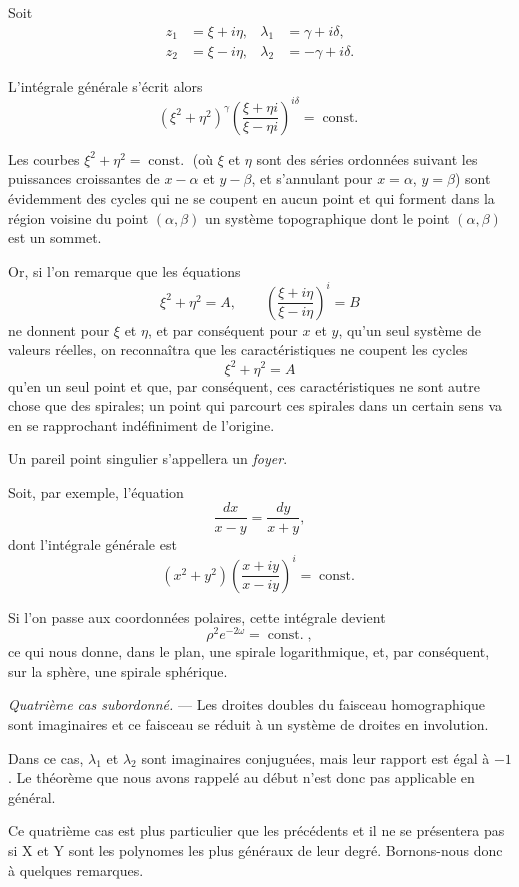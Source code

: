 \documentclass[11pt]{article}
\begin{document}
Soit
\[
\begin{aligned}
z_1&=\xi+i\eta,& \lambda_1&=\gamma+i\delta,\\
z_2&=\xi-i\eta,& \lambda_2&=-\gamma+i\delta.
\end{aligned}
\]

L’intégrale générale s’écrit alors
\[
(\xi^2+\eta^2)^\gamma\left(\frac{\xi+\eta i}{\xi-\eta i}\right)^{i\delta}=\operatorname{const.}
\]

Les courbes $\xi^2+\eta^2=\operatorname{const.}$ (où $\xi$ et $\eta$ sont des séries ordonnées suivant les puissances croissantes de $x-\alpha$ et $y-\beta$, et s’annulant pour $x=\alpha$, $y=\beta$) sont évidemment des cycles qui ne se coupent en aucun point et qui forment dans la région voisine du point $(\alpha,\beta)$ un système topographique dont le point $(\alpha,\beta)$ est un sommet.

Or, si l’on remarque que les équations
\[
\xi^2+\eta^2=A,
\qquad
\left(\frac{\xi+i\eta}{\xi-i\eta}\right)^i=B
\]
ne donnent pour $\xi$ et $\eta$, et par conséquent pour $x$ et $y$, qu’un seul système de valeurs réelles, on reconnaîtra que les caractéristiques ne coupent les cycles
\[
\xi^2+\eta^2=A
\]
qu’en un seul point et que, par conséquent, ces caractéristiques ne sont autre chose que des spirales; un point qui parcourt ces spirales dans un certain sens va en se rapprochant indéfiniment de l’origine.

Un pareil point singulier s’appellera un \emph{foyer}.

Soit, par exemple, l’équation
\[
\frac{dx}{x-y}=\frac{dy}{x+y},
\]
dont l’intégrale générale est
\[
(x^2+y^2)\left(\frac{x+iy}{x-iy}\right)^i=\operatorname{const.}
\]

Si l’on passe aux coordonnées polaires, cette intégrale devient
\[
\rho^2e^{-2\omega}=\operatorname{const.},
\]
ce qui nous donne, dans le plan, une spirale logarithmique, et, par conséquent, sur la sphère, une spirale sphérique.

\emph{Quatrième cas subordonné.} --- Les droites doubles du faisceau homographique sont imaginaires et ce faisceau se réduit à un système de droites en involution.

Dans ce cas, $\lambda_1$ et $\lambda_2$ sont imaginaires conjuguées, mais leur rapport est égal à $-1$. Le théorème que nous avons rappelé au début n’est donc pas applicable en général.

Ce quatrième cas est plus particulier que les précédents et il ne se présentera pas si X et Y sont les polynomes les plus généraux de leur degré. Bornons-nous donc à quelques remarques.
\end{document}
